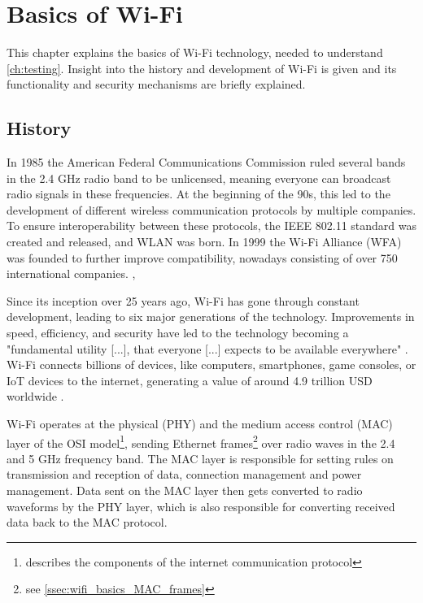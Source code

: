 \chapter{Basics of Wi-Fi}\label{ch:basics_wifi}

This chapter explains the basics of Wi-Fi technology, needed to understand \cref{ch:testing}.
Insight into the history and development of Wi-Fi is given and its functionality and security mechanisms are briefly explained.

\section{History}

In 1985 the American Federal Communications Commission ruled several bands in the 2.4 GHz radio band to be unlicensed, meaning everyone can broadcast radio signals in these frequencies.
At the beginning of the 90s, this led to the development of different wireless communication protocols by multiple companies.
To ensure interoperability between these protocols, the IEEE 802.11 standard was created and released, and WLAN was born.
In 1999 the Wi-Fi Alliance (WFA) was founded to further improve compatibility, nowadays consisting of over 750 international companies. \cite[page~1-3]{Sankaran_Gulasekaran_2021}, \cite{Wikipedia_2025}

Since its inception over 25 years ago, Wi-Fi has gone through constant development, leading to six major generations of the technology.
Improvements in speed, efficiency, and security have led to the technology becoming a "fundamental utility [...], that everyone [...] expects to be available everywhere" \cite[page~1]{Sankaran_Gulasekaran_2021}.
Wi-Fi connects billions of devices, like computers, smartphones, game consoles, or IoT devices to the internet, generating a value of around 4.9 trillion USD worldwide \cite[page~1]{Sankaran_Gulasekaran_2021}.

Wi-Fi operates at the physical (PHY) and the medium access control (MAC) layer of the OSI model\footnote{describes the components of the internet communication protocol}, sending Ethernet frames\footnote{see \cref{ssec:wifi_basics_MAC_frames}} over radio waves in the 2.4 and 5 GHz frequency band. 
The MAC layer is responsible for setting rules on transmission and reception of data, connection management and power management.
Data sent on the MAC layer then gets converted to radio waveforms by the PHY layer, which is also responsible for converting received data back to the MAC protocol. \cite[page~4-7]{Sankaran_Gulasekaran_2021}

